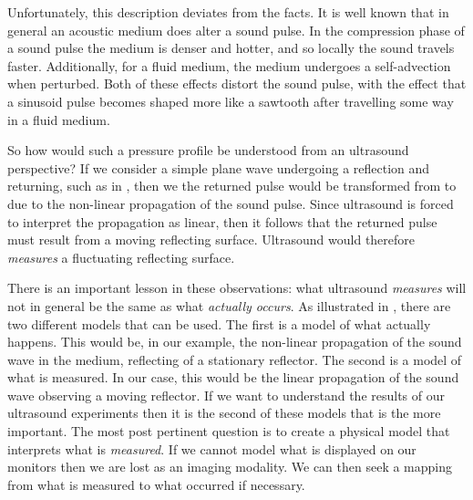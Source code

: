 
Unfortunately, this description deviates from the facts.
It is well known that in general an acoustic medium does alter a sound pulse.  
In the compression phase of a sound pulse the medium is denser and hotter, 
and so locally the sound travels faster.
Additionally, for a fluid medium,
the medium undergoes a self-advection when perturbed.
Both of these effects distort the sound pulse, 
with the effect that a sinusoid pulse becomes shaped more like a sawtooth after travelling some way in a fluid medium.

So how would such a pressure profile be understood from an ultrasound perspective?
If we consider a simple plane wave undergoing a reflection and returning, such as in  ,
then we the returned pulse would be transformed from  to 
due to the non-linear propagation of the sound pulse.
Since ultrasound is forced to interpret the propagation as linear,
then it follows that the returned pulse must result from a moving reflecting surface.
Ultrasound would therefore  {\em measures} a fluctuating reflecting surface.

There is an important lesson in these observations:
what ultrasound {\em measures} will not in general be the same as what {\em actually occurs}.
As illustrated in , there are two different models that can be used.
The first is a model of what actually happens.
This would be, in our example, the non-linear propagation of the sound wave in the medium, reflecting of a stationary reflector.
The second is a model of what is measured.
In our case, this would be the linear propagation of the sound wave observing a moving reflector.
If we want to understand the results of our ultrasound experiments then it is the second of these models that is the more important.
%
The most post pertinent question is to create a physical model that interprets what is {\em measured}.
If we cannot model what is displayed on our monitors then we are lost as an imaging modality.
We can then seek a mapping from what is measured to what occurred if necessary.
%

